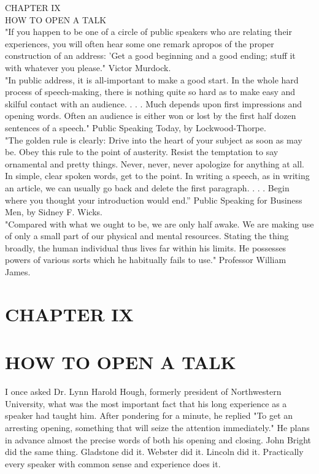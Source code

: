 \documentclass[10pt]{article}
\begin{document}
CHAPTER IX\\
HOW TO OPEN A TALK\\
"If you happen to be one of a circle of public speakers who are relating their experiences, you will often hear some one remark apropos of the proper construction of an address: 'Get a good beginning and a good ending; stuff it with whatever you please." Victor Murdock.\\
"In public address, it is all-important to make a good start. In the whole hard process of speech-making, there is nothing quite so hard as to make easy and skilful contact with an audience. . . . Much depends upon first impressions and opening words. Often an audience is either won or lost by the first half dozen sentences of a speech." Public Speaking Today, by Lockwood-Thorpe.\\
"The golden rule is clearly: Drive into the heart of your subject as soon as may be. Obey this rule to the point of austerity. Resist the temptation to say ornamental and pretty things. Never, never, never apologize for anything at all. In simple, clear spoken words, get to the point. In writing a speech, as in writing an article, we can usually go back and delete the first paragraph. . . . Begin where you thought your introduction would end.'' Public Speaking for Business Men, by Sidney F. Wicks.\\
"Compared with what we ought to be, we are only half awake. We are making use of only a small part of our physical and mental resources. Stating the thing broadly, the human individual thus lives far within his limits. He possesses powers of various sorts which he habitually fails to use." Professor William James.

\section*{CHAPTER IX}
\section*{HOW TO OPEN A TALK}
I once asked Dr. Lynn Harold Hough, formerly president of Northwestern University, what was the most important fact that his long experience as a speaker had taught him. After pondering for a minute, he replied "To get an arresting opening, something that will seize the attention immediately." He plans in advance almost the precise words of both his opening and closing. John Bright did the same thing. Gladstone did it. Webster did it. Lincoln did it. Practically every speaker with common sense and experience does it.
\end{document}
